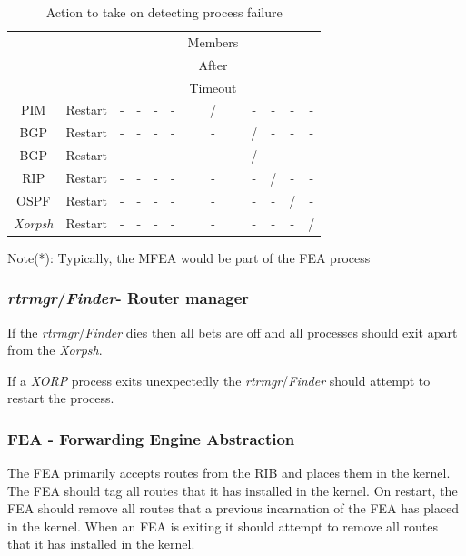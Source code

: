 \documentclass[11pt]{article}
\makeatletter
\newcommand{\xorp} {{\em XORP}\@\xspace}
\newcommand{\finder} {{\em Finder}\@\xspace}
\newcommand{\xorpsh} {{\em Xorpsh}\@\xspace}
\newcommand{\rtrmgr} {{\em rtrmgr}\@\xspace}
\makeatother
\begin{document}
\begin{table}[ht]
\begin{center}
\begin{tabular}{|c|c|c|c|c|c|c|c|c|c|c|}
                &                 &          &      &      &      & Members &      &      &      &         \\
                &                 &          &      &      &      & After   &      &      &      &         \\
                &                 &          &      &      &      & Timeout &      &      &      &         \\\hline
PIM             &  Restart        & -        & -    & -    & -    & /       & -    & -    & -    & -       \\\hline
BGP             &  Restart        & -        & -    & -    & -    & -       & /    & -    & -    & -       \\\hline
BGP             &  Restart        & -        & -    & -    & -    & -       & /    & -    & -    & -       \\\hline
RIP             &  Restart        & -        & -    & -    & -    & -       & -    & /    & -    & -       \\\hline
OSPF            &  Restart        & -        & -    & -    & -    & -       & -    & -    & /    & -       \\\hline
\xorpsh         &  Restart        & -        & -    & -    & -    & -       & -    & -    & -    & /       \\\hline
\end{tabular}
\end{center}
{\small Note(*): Typically, the MFEA would be part of the FEA process}
\caption{\label{failure_table}Action to take on detecting process failure}
\end{table}

\subsubsection{\rtrmgr/\finder - Router manager}

If the \rtrmgr/\finder dies then all bets are off and all processes
should exit apart from the \xorpsh.

If a \xorp process exits unexpectedly the \rtrmgr/\finder should
attempt to restart the process.

\subsubsection{FEA - Forwarding Engine Abstraction}

The FEA primarily accepts routes from the RIB and places them in the
kernel. The FEA should tag all routes that it has installed in the
kernel.  On restart, the FEA should remove all routes that a previous
incarnation of the FEA has placed in the kernel. When an FEA is
exiting it should attempt to remove all routes that it has installed
in the kernel.
\end{document}
